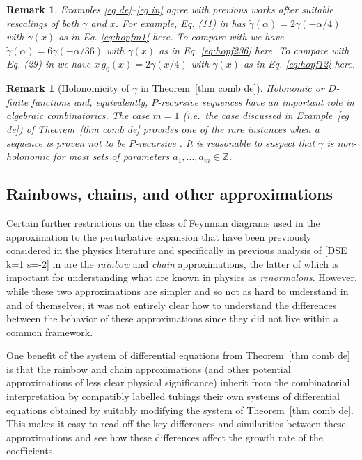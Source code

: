 \documentclass[oneside]{amsart}
\newtheorem{remark}[thm]{Remark}
\theoremstyle{definition}
\newcommand{\Z}{{\mathbb{Z}}}
\begin{document}
%

%
%
%
%
%
%
%
%
%
%
%
%
%
%
%
%
%
%
%
%
%
%
%
%
%
%
%
%
%
%
%
%
%
%
%
%
%
%
%

\begin{remark} Examples \ref{eg de}--\ref{eg in} agree with previous works \cite{bkerfc,bk30,BD,BDM,BB} after suitable rescalings of both $\gamma$ and $x$.
For example, Eq. (11) in \cite{BD} has $\tilde{\gamma}(\alpha)=2\gamma(-\alpha/4)$ with $\gamma(x)$ as in Eq. \eqref{eq:hopfm1} here. To compare with \cite{bkerfc,bk30,BDM} we have 
$\tilde{\gamma}(\alpha)=6\gamma(-\alpha/36)$ with $\gamma(x)$ as in Eq. \eqref{eq:hopf236} here. To compare with Eq. (29) in \cite{BB} we have 
$x\,\tilde{g}_0(x)=2\gamma(x/4)$ with $\gamma(x)$ as in Eq. \eqref{eq:hopf12} here.
%
%
%
%
%
%
%
    \label{rem:rescaling}
\end{remark}

\begin{remark}[Holonomicity of $\gamma$ in Theorem~\ref{thm comb de}]
Holonomic or $D$-finite functions and, equivalently, $P$-recursive sequences have an important role in algebraic combinatorics. 
The case $m=1$ (i.e.~the case discussed in Example~\ref{eg de}) of Theorem~\ref{thm comb de} provides one of the rare instances when a sequence is proven not to be $P$-recursive \cite{MR1979786}. 
It is reasonable to suspect that $\gamma$ is non-holonomic for most sets of parameters $a_1,\ldots,a_m\in \Z$.
\end{remark}

\subsection{Rainbows, chains, and other approximations}
\label{sec:approxs}
Certain further restrictions on the class of Feynman diagrams used in the approximation to the perturbative expansion that have been previously considered in the physics literature and specifically in previous analysis of \eqref{DSE k=1 s=-2} in \cite{BD} are the \emph{rainbow} and \emph{chain} approximations, the latter of which is important for understanding what are known in physics as \emph{renormalons}.  However, while these two approximations are simpler and so not as hard to understand in and of themselves, it was not entirely clear how to understand the differences between the behavior of these approximations since they did not live within a common framework.

One benefit of the system of differential equations from Theorem~\ref{thm comb de} is that the rainbow and chain approximations (and other potential approximations of less clear physical significance) inherit from the combinatorial interpretation by compatibly labelled tubings their own systems of differential equations obtained by suitably modifying the system of Theorem~\ref{thm comb de}.  This makes it easy to read off the key differences and similarities between these approximations and see how these differences affect the growth rate of the coefficients. 
\end{document}

